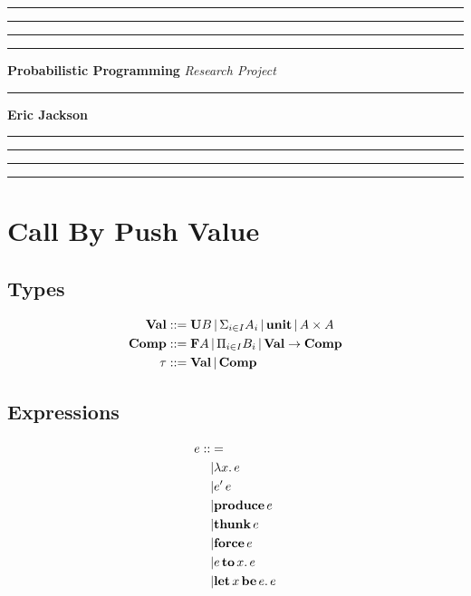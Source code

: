 \documentclass{article}
\begin{document}
	\hrule
	\smallskip
	\hrule\hrule\hrule
	\medskip
	\noindent
	{\huge \bf Probabilistic Programming}
	\medskip
	\newline
	{\huge \it Research Project}

	\hrule
	\medskip
	\noindent
	{\Large \bf Eric Jackson}
	\medskip
	\hrule\hrule\hrule
	\smallskip
	\hrule

\section{Call By Push Value}
	\subsection{Types}
		\begin{equation*}
			\begin{split}
				{\bf Val}  &::= {\bf U} B  \,|\, \Sigma_{i \in I} A_i \,|\, {\bf unit}      \,|\, A \times A \\
				{\bf Comp} &::= {\bf F} A  \,|\, \Pi_{i \in I} B_i    \,|\, {\bf Val} \rightarrow {\bf Comp}                  \\
				\tau       &::= {\bf Val}  \,|\, {\bf Comp}                                                  \\
			\end{split}
		\end{equation*}
		
	\subsection{Expressions}
		\begin{equation*}
			\begin{split}
				e ::&=                                   \\
				    &| \lambda x.\, e                    \\
				    &| e'\, e                      	 			 \\
				    &| {\bf produce}\, e                 \\
 				    &| {\bf thunk}\, e                   \\
				    &| {\bf force}\, e	 	                 \\
				    &| e\, {\bf to}\, x.\, e             \\ 
				    &| {\bf let}\, x\, {\bf be}\, e.\, e \\
			\end{split}
		\end{equation*}
\end{document}
